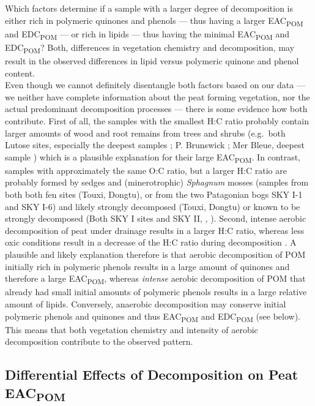 \documentclass[draft,linenumbers]{agujournal2018}
\begin{document}
Which factors determine if a sample with a larger degree of
decomposition is either rich in polymeric quinones and phenols --- thus
having a larger EAC\textsubscript{POM} and EDC\textsubscript{POM} --- or
rich in lipids --- thus having the minimal EAC\textsubscript{POM} and
EDC\textsubscript{POM}? Both, differences in vegetation chemistry and
decomposition, may result in the observed differences in lipid versus
polymeric quinone and phenol content.\\
Even though we cannot definitely disentangle both factors based on our
data --- we neither have complete information about the peat forming
vegetation, nor the actual predominant decomposition processes --- there
is some evidence how both contribute. First of all, the samples with the
smallest H:C ratio probably contain larger amounts of wood and root
remains from trees and shrubs (e.g.~both Lutose sites, especially the
deepest samples \citep{Heffernan.2020}; P. Brunswick
\citep{Broder.2012}; Mer Bleue, deepest sample \citep{Elliott.2012})
which is a plausible explanation for their large EAC\textsubscript{POM}.
In contrast, samples with approximately the same O:C ratio, but a larger
H:C ratio are probably formed by sedges and (minerotrophic)
\emph{Sphagnum} mosses (samples from both both fen sites (Touxi,
Dongtu), or from the two Patagonian bogs SKY I-1 and SKY I-6) and likely
strongly decomposed (Touxi, Dongtu) or known to be strongly decomposed
(Both SKY I sites and SKY II, \citet{Broder.2012},
\citet{Mathijssen.2019}). Second, intense aerobic decomposition of peat
under drainage results in a larger H:C ratio, whereas less oxic
conditions result in a decrease of the H:C ratio during decomposition
\citep{Leifeld.2012}. A plausible and likely explanation therefore is
that aerobic decomposition of POM initially rich in polymeric phenols
results in a large amount of quinones and therefore a large
EAC\textsubscript{POM}, whereas \emph{intense} aerobic decomposition of
POM that already had small initial amounts of polymeric phenols results
in a large relative amount of lipids. Conversely, anaerobic
decomposition may conserve initial polymeric phenols and quinones and
thus EAC\textsubscript{POM} and EDC\textsubscript{POM} (see below). This
means that both vegetation chemistry and intensity of aerobic
decomposition contribute to the observed pattern.

\subsection{\texorpdfstring{Differential Effects of Decomposition on
Peat
EAC\textsubscript{POM}}{Differential Effects of Decomposition on Peat EAC}}
\end{document}
